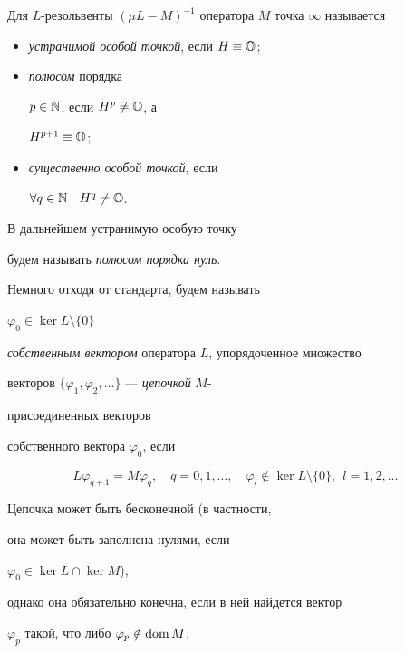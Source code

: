 \begin{defns}


Для $L$-резольвенты $(\mu L-M)^{-1}$ оператора $M$ точка $\infty$ называется


\begin{itemize}


\item[(i)] {\it устранимой особой точкой}, если $H \equiv {\Bbb O}$;


\item[(ii)] {\it полюсом} порядка


$p\in {\Bbb N}$, если $H^p \ne {\Bbb O}$, а


$H^{p+1} \equiv {\Bbb O}$;


\item[(iii)] {\it существенно особой точкой}, если


$\forall q\in {\Bbb N}$ \ $H^q\ne {\Bbb O}$.


\end{itemize}


\end{defns}





В дальнейшем устранимую особую точку 


будем называть {\it полюсом порядка нуль}.





Немного отходя от стандарта, будем называть


$\varphi_0\in \ker L\setminus\{ 0\}$ 


{\it собственным вектором} оператора $L$, упорядоченное множество


векторов $\{\varphi_1,\varphi_2,\dotsc\}$ --- {\it цепочкой} $M$-{\it


присоединенных векторов} собственного вектора $\varphi_0$, если


$$


L\varphi_{q+1}=M\varphi_q,\quad q=0,1,\dotsc,


\quad\varphi_l\notin \ker L\setminus\{ 0\},\ \ l=1,2,\dotsc


$$


Цепочка может быть бесконечной (в частности, 


она может быть заполнена нулями, если


$\varphi_0 \in \ker L \cap \ker M$), 


однако она обязательно конечна, если в ней найдется вектор


$\varphi_p$ такой, что либо $\varphi_p \notin \operatorname{dom} M$,


